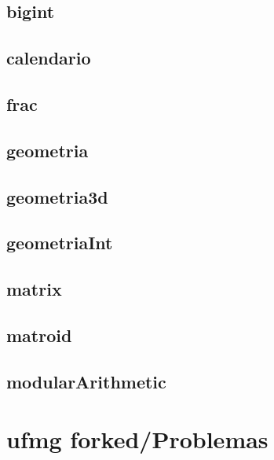 \subsection{bigint}
\raggedbottom
\hrulefill
\subsection{calendario}
\raggedbottom
\hrulefill
\subsection{frac}
\raggedbottom
\hrulefill
\subsection{geometria}
\raggedbottom
\hrulefill
\subsection{geometria3d}
\raggedbottom
\hrulefill
\subsection{geometriaInt}
\raggedbottom
\hrulefill
\subsection{matrix}
\raggedbottom
\hrulefill
\subsection{matroid}
\raggedbottom
\hrulefill
\subsection{modularArithmetic}
\raggedbottom
\hrulefill

\section{ufmg forked/Problemas}
